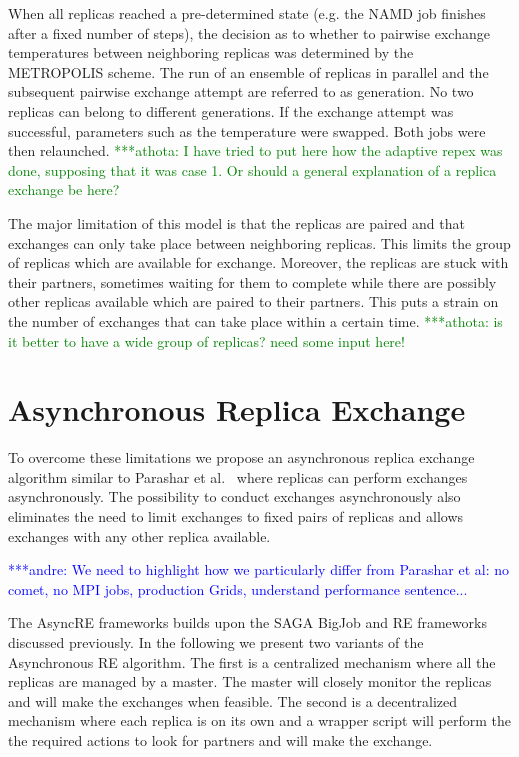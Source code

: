 \documentclass[a4paper,10pt]{article}
\newcommand{\alnote}[1]{ {\textcolor{blue} { ***andre: #1 }}}
\newcommand{\athotanote}[1]{ {\textcolor{green} { ***athota: #1 }}}
\newcommand{\alnote}[1]{}
\newcommand{\athotanote}[1]{}
\begin{document}
When all replicas reached a pre-determined state (e.g. the NAMD job finishes
after a fixed number of steps), the decision as to whether to pairwise exchange
temperatures between neighboring replicas was determined by the METROPOLIS
scheme. The run of an ensemble of replicas in parallel and the subsequent
pairwise exchange attempt are referred to as generation. No two replicas can
belong to different generations. If the exchange attempt was successful, parameters
such as the temperature were swapped. Both jobs were then relaunched. 
\athotanote{I have tried to put here how the adaptive repex was done, supposing 
that it was case 1. Or should a general explanation of a replica exchange be here?}
 
The major limitation of this model is that the replicas are paired and that exchanges can only take place between neighboring replicas. 
This limits the group of replicas which are available for exchange. Moreover, the replicas are stuck with their partners, 
sometimes waiting for them to complete while there are possibly other replicas available which are paired to their partners.
This puts a strain on the number of exchanges that can take place within a certain time.
\athotanote{is it better to have a wide group of replicas?  need some input here!}
  
\section{Asynchronous Replica Exchange}
To overcome these limitations we propose an asynchronous replica exchange algorithm
similar to Parashar et al.~\cite{parashar_arepex} where replicas can perform  
exchanges asynchronously. The possibility to conduct exchanges asynchronously also eliminates the need 
to limit exchanges to fixed pairs of replicas and allows exchanges with any other replica available. 
 
\alnote{We need to highlight how we particularly differ from Parashar et al: no comet, no MPI jobs, production
Grids, understand performance sentence...}

The AsyncRE frameworks builds upon the SAGA BigJob and RE frameworks discussed previously.
In the following we present two variants of the Asynchronous RE algorithm. The first is a centralized 
mechanism where all the replicas are managed by a master. The master will closely monitor the replicas and will make the exchanges when feasible. 
The second is a decentralized mechanism where each replica is on its own and a wrapper script will perform the
the required actions to look for partners and will make the exchange.
\end{document}
